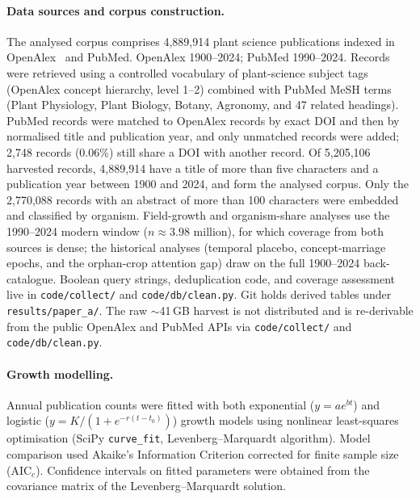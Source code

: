 
\paragraph{Data sources and corpus construction.}
The analysed corpus comprises 4,889,914 plant science publications indexed in
OpenAlex~\cite{priem2022openalex} and PubMed.
OpenAlex 1900--2024; PubMed 1990--2024.
Records were retrieved using a controlled vocabulary of plant-science
subject tags (OpenAlex concept hierarchy, level 1--2) combined with
PubMed MeSH terms (Plant Physiology, Plant Biology, Botany, Agronomy,
and 47 related headings).
PubMed records were matched to OpenAlex records by exact DOI and then by
normalised title and publication year, and only unmatched records were added;
2,748 records (0.06\%) still share a DOI with another record.
Of 5,205,106 harvested records, 4,889,914 have a title of more than five
characters and a publication year between 1900 and 2024, and form the analysed
corpus.
Only the 2,770,088 records with an abstract of more than 100 characters were
embedded and classified by organism.
Field-growth and organism-share analyses use the 1990--2024 modern window
($n \approx 3.98$ million), for which coverage from both sources is dense;
the historical analyses (temporal placebo, concept-marriage epochs, and the
orphan-crop attention gap) draw on the full 1900--2024 back-catalogue.
Boolean query strings, deduplication code, and coverage assessment live in
\texttt{code/collect/} and \texttt{code/db/clean.py}.
Git holds derived tables under \texttt{results/paper\_a/}. The raw
$\sim$41\,GB harvest is not distributed and is re-derivable from the public
OpenAlex and PubMed APIs via \texttt{code/collect/} and \texttt{code/db/clean.py}.

\paragraph{Growth modelling.}
Annual publication counts were fitted with both exponential
($y = a e^{bt}$) and logistic
($y = K / (1 + e^{-r(t - t_0)})$) growth models using nonlinear least-squares
optimisation (SciPy \texttt{curve\_fit}, Levenberg--Marquardt algorithm).
Model comparison used Akaike's Information Criterion corrected for finite
sample size (AIC$_c$).
Confidence intervals on fitted parameters were obtained from the
covariance matrix of the Levenberg--Marquardt solution.

